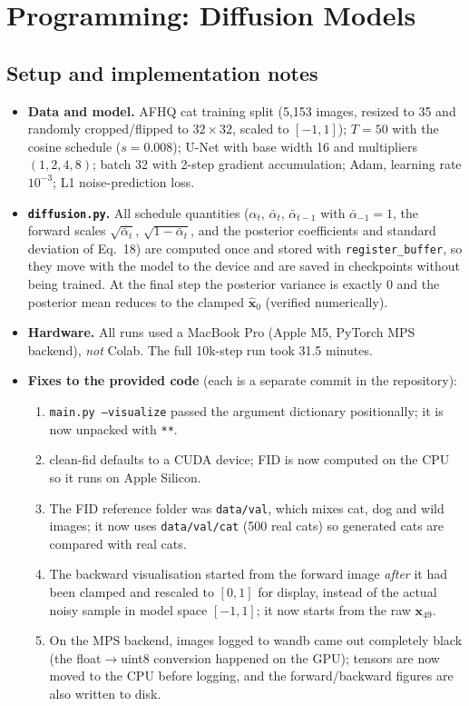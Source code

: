 \documentclass[11pt,a4paper]{article}
\newcommand{\x}{\mathbf{x}}
\newcommand{\abar}{\bar{\alpha}}
\begin{document}
\section{Programming: Diffusion Models}

\subsection*{Setup and implementation notes}

\begin{itemize}[nosep]
\item \textbf{Data and model.} AFHQ cat training split (5{,}153 images, resized to 35 and randomly cropped/flipped to $32\times32$, scaled to $[-1,1]$); $T=50$ with the cosine schedule ($s=0.008$); U-Net with base width 16 and multipliers $(1,2,4,8)$; batch 32 with 2-step gradient accumulation; Adam, learning rate $10^{-3}$; L1 noise-prediction loss.
\item \textbf{\texttt{diffusion.py}.} All schedule quantities ($\alpha_t$, $\abar_t$, $\abar_{t-1}$ with $\abar_{-1}=1$, the forward scales $\sqrt{\abar_t}$, $\sqrt{1-\abar_t}$, and the posterior coefficients and standard deviation of Eq.~18) are computed once and stored with \texttt{register\_buffer}, so they move with the model to the device and are saved in checkpoints without being trained. At the final step the posterior variance is exactly $0$ and the posterior mean reduces to the clamped $\hat{\x}_0$ (verified numerically).
\item \textbf{Hardware.} All runs used a MacBook Pro (Apple M5, PyTorch MPS backend), \emph{not} Colab. The full 10k-step run took 31.5 minutes.
\item \textbf{Fixes to the provided code} (each is a separate commit in the repository):
  \begin{enumerate}[nosep]
  \item \texttt{main.py --visualize} passed the argument dictionary positionally; it is now unpacked with \texttt{**}.
  \item clean-fid defaults to a CUDA device; FID is now computed on the CPU so it runs on Apple Silicon.
  \item The FID reference folder was \texttt{data/val}, which mixes cat, dog and wild images; it now uses \texttt{data/val/cat} (500 real cats) so generated cats are compared with real cats.
  \item The backward visualisation started from the forward image \emph{after} it had been clamped and rescaled to $[0,1]$ for display, instead of the actual noisy sample in model space $[-1,1]$; it now starts from the raw $\x_{49}$.
  \item On the MPS backend, images logged to wandb came out completely black (the float$\to$uint8 conversion happened on the GPU); tensors are now moved to the CPU before logging, and the forward/backward figures are also written to disk.
  \end{enumerate}
\end{itemize}
\end{document}
